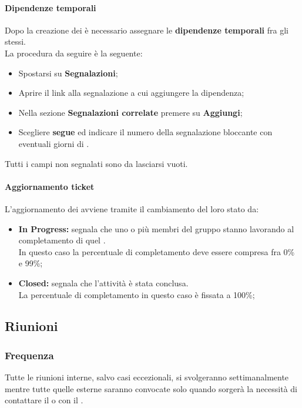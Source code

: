           \paragraph{Dipendenze temporali}
            Dopo la creazione dei  è necessario assegnare le \textbf{dipendenze temporali} fra gli stessi.\\
            La procedura da seguire è la seguente:
            \begin{itemize}
              \item Spostarsi su \textbf{Segnalazioni};
              \item Aprire il link alla segnalazione a cui aggiungere la dipendenza;
              \item Nella sezione \textbf{Segnalazioni correlate} premere su \textbf{Aggiungi};
              \item Scegliere \textbf{segue} ed indicare il numero della segnalazione bloccante con eventuali giorni di .
            \end{itemize}
            Tutti i campi non segnalati sono da lasciarsi vuoti.
        \paragraph{Aggiornamento ticket}
          L'aggiornamento dei  avviene tramite il cambiamento del loro stato da:
          \begin{itemize}
            \item \textbf{In Progress: }segnala che uno o più membri del gruppo stanno lavorando al completamento di quel .\\
            In questo caso la percentuale di completamento deve essere compresa fra 0\% e 99\%;
            \item \textbf{Closed: }segnala che l'attività è stata conclusa.\\
            La percentuale di completamento in questo caso è fissata a 100\%;
          \end{itemize}
    \subsection{Riunioni}
      \subsubsection{Frequenza}
        Tutte le riunioni interne, salvo casi eccezionali, si svolgeranno settimanalmente mentre tutte quelle esterne saranno convocate solo quando sorgerà la necessità di contattare il  o con il .
